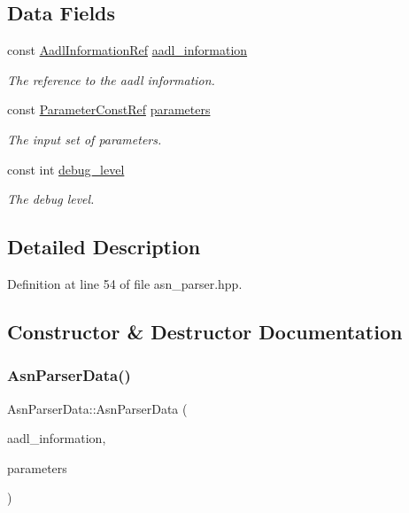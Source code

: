 \subsection*{Data Fields}
\begin{DoxyCompactItemize}
\item 
const \hyperlink{aadl__information_8hpp_ad2aa3a9df7fbf64760e8fc1a5e7b9b3e}{Aadl\+Information\+Ref} \hyperlink{structAsnParserData_ae22aa0389c4544b1b987c0597cb72930}{aadl\+\_\+information}
\begin{DoxyCompactList}\small\item\em The reference to the aadl information. \end{DoxyCompactList}\item 
const \hyperlink{Parameter_8hpp_a37841774a6fcb479b597fdf8955eb4ea}{Parameter\+Const\+Ref} \hyperlink{structAsnParserData_ac25a39d9cca4361a71ed73e4d1ba6955}{parameters}
\begin{DoxyCompactList}\small\item\em The input set of parameters. \end{DoxyCompactList}\item 
const int \hyperlink{structAsnParserData_af78b30a1f7336e3d48b160957e695f93}{debug\+\_\+level}
\begin{DoxyCompactList}\small\item\em The debug level. \end{DoxyCompactList}\end{DoxyCompactItemize}


\subsection{Detailed Description}


Definition at line 54 of file asn\+\_\+parser.\+hpp.



\subsection{Constructor \& Destructor Documentation}
\mbox{\label{structAsnParserData_af3b55b2373eb5bb6e36b1b33f672b0c8}} 
\subsubsection{\texorpdfstring{Asn\+Parser\+Data()}{AsnParserData()}}
{\footnotesize\ttfamily Asn\+Parser\+Data\+::\+Asn\+Parser\+Data (\begin{DoxyParamCaption}\item[{const \hyperlink{aadl__information_8hpp_ad2aa3a9df7fbf64760e8fc1a5e7b9b3e}{Aadl\+Information\+Ref}}]{aadl\+\_\+information,  }\item[{const \hyperlink{Parameter_8hpp_a37841774a6fcb479b597fdf8955eb4ea}{Parameter\+Const\+Ref}}]{parameters }\end{DoxyParamCaption})}



